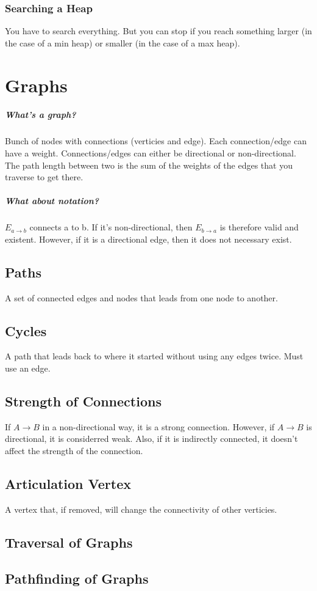 \documentclass[a4paper,12pt]{report}
\begin{document}
\subsection{Searching a Heap}
You have to search everything. But you can stop if you reach something larger (in the case of a min heap) or smaller (in the case of a max heap). 

\chapter{Graphs}
\paragraph{What's a graph? } Bunch of nodes with connections (verticies and edge). Each connection/edge can have a weight. Connections/edges can either be directional or non-directional. The path length between two is the sum of the weights of the edges that you traverse to get there. 

\paragraph{What about notation? } $E_{a \to b}$ connects a to b. If it's non-directional, then $E_{b \to a}$ is therefore valid and existent. However, if it is a directional edge, then it does not necessary exist.

\section{Paths}
A set of connected edges and nodes that leads from one node to another.

\section{Cycles}
A path that leads back to where it started without using any edges twice. Must use an edge.

\section{Strength of Connections}
If $A \to B$ in a non-directional way, it is a strong connection. However, if $A \to B$ is directional, it is considerred weak. Also, if it is indirectly connected, it doesn't affect the strength of the connection.

\section{Articulation Vertex}
A vertex that, if removed, will change the connectivity of other verticies. 

\section{Traversal of Graphs}

\section{Pathfinding of Graphs}
\end{document}
